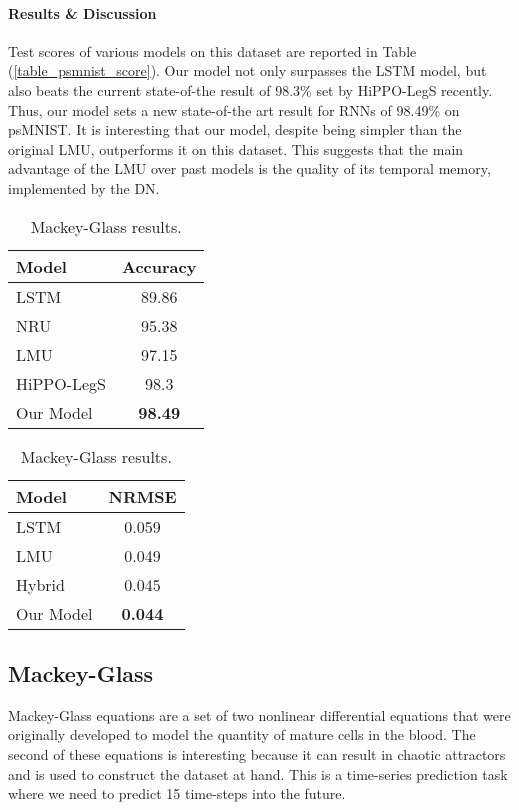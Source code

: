\documentclass{article}
\begin{document}
\paragraph{Results \& Discussion} Test scores of various models on this dataset are reported in Table (\ref{table_psmnist_score}). Our model not only surpasses the LSTM model, but also beats the current state-of-the result of 98.3\% set by HiPPO-LegS \citep{gu2020hippo} recently. Thus, our model sets a new state-of-the art result for RNNs of 98.49\% on psMNIST. It is interesting that our model,
despite being simpler than the original LMU, outperforms it on this dataset. This suggests that the main advantage of the LMU over past models is the quality of its temporal memory, implemented by the DN. 

\begin{table}
\parbox{.45\linewidth}{
\centering
\caption{ psMNIST results. The first three rows are from  \citet{voelker2019legendre}, and the fourth row is from \citet{gu2020hippo}.}
\label{table_psmnist_score}
\begin{tabular}{lc}
\hline\noalign{\smallskip}
Model & Accuracy\\
\hline\noalign{\smallskip}
LSTM & 89.86\\
NRU & 95.38\\
LMU & 97.15\\
HiPPO-LegS & 98.3\\
Our Model &  {\bf 98.49}  \\
\hline
\end{tabular}

}
\hfill
\parbox{.45\linewidth}{
\centering
\caption{Mackey-Glass results.}
\label{table: mackey-glass}
\begin{tabular}{lc}
\hline\noalign{\smallskip}
Model & NRMSE  \\
\hline\noalign{\smallskip}
LSTM        &  0.059       \\
LMU         &  0.049      \\
Hybrid      &  0.045        \\
Our Model   &  {\bf 0.044} \\
\hline
\end{tabular}

}
\end{table}


\subsection{Mackey-Glass}
Mackey-Glass equations are a set of two nonlinear differential equations that were originally developed to model the quantity of mature cells in the blood. The second of these equations is interesting because it can result in chaotic attractors and is used to construct the dataset at hand. This is a time-series prediction task where we need to predict 15 time-steps into the future.
\end{document}
